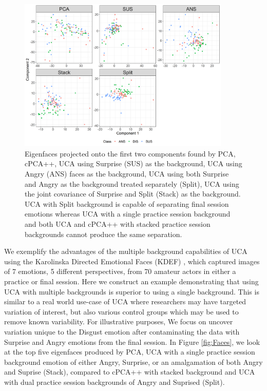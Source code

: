 \documentclass[12pt]{article}
\begin{document}
\begin{figure}[!th]
    \centering
	\includegraphics[width = 0.9\textwidth]{figure/F_Surprise_Angry_Disgust_projected.png}
    \caption{Eigenfaces projected onto the first two components found by PCA, cPCA++, UCA using Surprise (SUS) as the background, UCA using Angry (ANS) faces as the background, UCA using both Surprise and Angry as the background treated separately (Split), UCA using the joint covariance of Surprise and Split (Stack) as the background. UCA with Split background is capable of separating final session emotions whereas UCA with a single practice session background and both UCA and cPCA++ with stacked practice session backgrounds cannot produce the same separation.}
	\label{fig:Face_Projections}
\end{figure}
We exemplify the advantages of the multiple background capabilities of UCA using the Karolinska Directed Emotional Faces (KDEF) \cite{Calvo2008}, which captured images of 7 emotions, 5 different perspectives, from 70 amateur actors in either a practice or final session.
Here we construct an example demonstrating that using UCA with multiple backgrounds is superior to using a single background. 
This is similar to a real world use-case of UCA where researchers may have targeted variation of interest, but also various control groups which may be used to remove known variability.
For illustrative purposes, We focus on  uncover variation unique to the Disgust emotion after contaminating the data with Surprise and Angry emotions from the final session. 
In Figure \ref{fig:Faces}, we look at the top five eigenfaces produced by PCA, UCA with a single practice session background emotion of either Angry, Surprise, or an amalgamation of both Angry and Suprise (Stack), compared to cPCA++ with stacked background and UCA with dual practice session backgrounds of Angry and Suprised (Split). 
\end{document}
